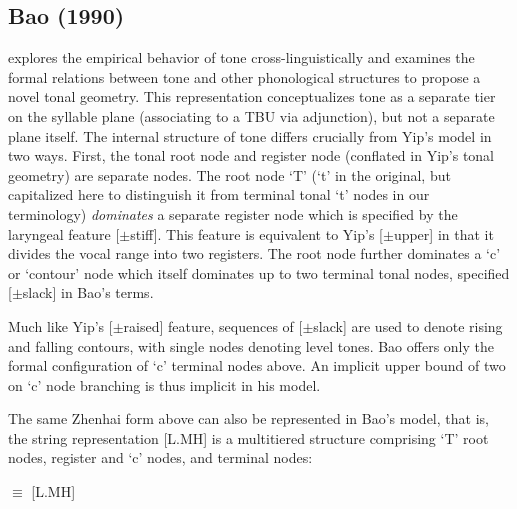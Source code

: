\documentclass{article}
\begin{document}
\subsection{Bao (1990)}
\citet{Bao1990} explores the empirical behavior of tone cross-linguistically and examines the formal relations between tone and other phonological structures to propose a novel tonal geometry. This representation conceptualizes tone as a separate tier on the syllable plane (associating to a TBU via adjunction), but not a separate plane itself. The internal structure of tone differs crucially from Yip's model in two ways. First, the tonal root node and register node (conflated in Yip's tonal geometry) are separate nodes. The root node `T' (`t' in the original, but capitalized here to distinguish it from terminal tonal `t' nodes in our terminology) \emph{dominates} a separate register node which is specified by the laryngeal feature [$\pm$stiff]. This feature is equivalent to Yip's [$\pm$upper] in that it divides the vocal range into two registers. The root node further dominates a `c' or `contour' node which itself dominates up to two terminal tonal nodes, specified [$\pm$slack] in Bao's terms.
\begin{center}
\end{center}
Much like Yip's [$\pm$raised] feature, sequences of [$\pm$slack] are used to denote rising and falling contours, with single nodes denoting level tones. Bao offers only the formal configuration of `c' terminal nodes above. An implicit upper bound of two on `c' node branching is thus implicit in his model.\par
The same Zhenhai form above can also be represented in Bao's model, that is, the string representation [L.MH] is a multitiered structure comprising `T' root nodes, register and `c' nodes, and terminal nodes:
\begin{center}
\hspace{1cm}
$\equiv$
\hspace{1cm}
[L.MH]
\end{center}
\end{document}
